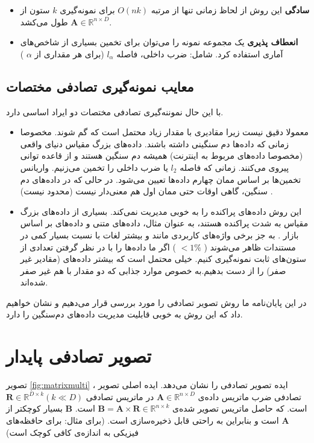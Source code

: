 \begin{itemize}
\item
\textbf{سادگی}
این روش از لحاظ زمانی تنها از مرتبه 
$O(nk)$
برای نمونه‌گیری 
$k$ 
ستون از 
$\mathbf{A} \in \mathbb{R}^{n \times D}$
طول می‌کشد.
\item
\textbf{انعطاف پذیری}
یک مجموعه نمونه را می‌توان برای تخمین بسیاری از شاخص‌های آماری استفاده کرد. شامل: ضرب داخلی، فاصله
$l_\alpha$
(برای هر مقداری از 
$\alpha$
)
\end{itemize}

\subsection{معایب نمونه‌گیری تصادفی مختصات}
با این حال نموننه‌گیری تصادفی مختصات دو ایراد اساسی دارد.
\begin{itemize}
\item
معمولا دقیق نیست زیرا مقادیری با مقدار زیاد محتمل است که گم شوند. مخصوصا زمانی که داده‌ها دم سنگینی داشته باشند. داده‌های بزرگ مقیاس دنیای واقعی (مخصوصا داده‌های مربوط به اینترنت) همیشه دم  سنگین هستند و از قاعده توانی پیروی می‌کنند.
\cite{litez142,litez66, litez53, litez111}
زمانی که فاصله 
$l_2$
یا ضرب داخلی را تخمین می‌زنیم. واریانس تخمین‌ها بر اساس ممان چهارم داده‌ها تعیین می‌شود. در حالی که در داده‌های دم سنگین، گاهی اوقات حتی ممان اول هم معنی‌دار نیست (محدود نیست)
\cite{litez142}
.
\item
این روش داده‌های پراکنده را به خوبی مدیریت نمی‌کند. بسیاری از داده‌های بزرگ مقیاس به شدت پراکنده هستند، به عنوان مثال، داده‌های متنی 
\cite{litez60}
و داده‌های بر اساس بازار
\cite{litez7, litez158}
. به جز برخی واژه‌های کاربردی مانند 
 و 
بیشتر لغات با نسبت بسیار کمی در مستندات ظاهر می‌شوند (
$<1\%$
)
اگر ما داده‌ها را با در نظر گرفتن تعدادی از ستون‌های ثابت نمونه‌گیری کنیم. خیلی محتمل است که بیشتر داده‌های (مقادیر غیر صفر) را از دست بدهیم.به خصوص موارد جذابی که دو مقدار با هم غیر صفر شده‌اند.
\end{itemize}
در این پایان‌نامه ما روش تصویر تصادفی را مورد بررسی قرار می‌دهیم و نشان خواهیم داد که این روش به خوبی قابلیت مدیریت داده‌های دم‌سنگین را دارد.

\section{تصویر تصادفی پایدار}
تصویر
\autoref{fig:matrixmulti}
، ایده تصویر تصادفی را نشان می‌دهد. ایده اصلی تصویر تصادفی ضرب ماتریس داده‌ی 
$\mathbf{A} \in \mathbb{R}^{n \times D}$
در ماتریس تصادفی 
$\mathbf{R} \in \mathbb{R}^{D \times k} (k \ll D)$
است. که حاصل ماتریس تصویر شده‌ی 
$\mathbf{B} = \mathbf{A} \times \mathbf{R} \in \mathbb{R}^{n \times k}$
است. 
$\mathbf{B}$
بسیار کوچکتر از 
$\mathbf{A}$
است و بنابراین به راحتی قابل ذخیره‌سازی است. (برای مثال: برای حافظه‌های فیزیکی به اندازه‌ی کافی کوچک است)

